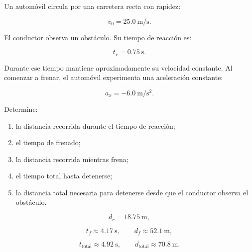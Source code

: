 \begin{ejercicio}
Un automóvil circula por una carretera recta con rapidez:

\[ v_0=\SI{25.0}{\meter\per\second}. \]

El conductor observa un obstáculo. Su tiempo de reacción es:

\[ t_r=\SI{0.75}{\second}. \]

Durante ese tiempo mantiene aproximadamente su velocidad constante. Al comenzar a frenar, el automóvil experimenta una aceleración constante:

\[ a_x=-\SI{6.0}{\meter\per\second\squared}. \]

Determine:

\begin{enumerate}[label=\alph*)]
    \item la distancia recorrida durante el tiempo de reacción;
    \item el tiempo de frenado;
    \item la distancia recorrida mientras frena;
    \item el tiempo total hasta detenerse;
    \item la distancia total necesaria para detenerse desde que el conductor observa el obstáculo.
\end{enumerate}
\end{ejercicio}

\begin{respuesta}
\[
d_r=\SI{18.75}{\meter},
\]

\[
t_f\approx\SI{4.17}{\second},
\qquad
d_f\approx\SI{52.1}{\meter},
\]

\[
t_{\mathrm{total}}\approx\SI{4.92}{\second},
\qquad
d_{\mathrm{total}}\approx\SI{70.8}{\meter}.
\]
\end{respuesta}

